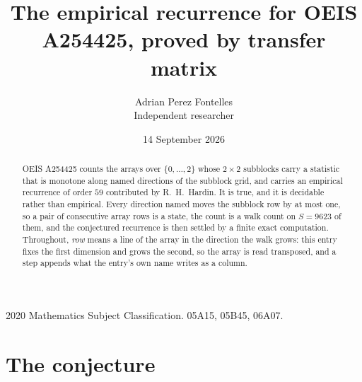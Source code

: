 \documentclass[11pt,a4paper]{article}
\title{The empirical recurrence for OEIS A254425, proved by transfer matrix}
\author{Adrian Perez Fontelles\\ \small Independent researcher}
\date{14 September 2026}
\theoremstyle{plain}
\theoremstyle{definition}
\begin{document}
\maketitle

\begin{abstract}
OEIS A254425 counts the arrays over $\{0,\dots,2\}$ whose $2\times2$ subblocks carry a
statistic that is monotone along named directions of the subblock grid, and carries an
empirical recurrence of order $59$ contributed by R.~H.~Hardin. It is true, and it is
decidable rather than empirical. Every direction named moves the subblock row by at most one,
so a pair of consecutive array rows is a state, the count is a walk count on $S=9623$ of them,
and the conjectured recurrence is then settled by a finite exact computation.
 Throughout, \emph{row} means a line of the array in the direction the walk grows: this entry fixes the first dimension and grows the second, so the array is read transposed, and a step appends what the entry's own name writes as a column.\end{abstract}

\noindent\small 2020 Mathematics Subject Classification. 05A15, 05B45, 06A07.\normalsize

\section{The conjecture}
\end{document}
